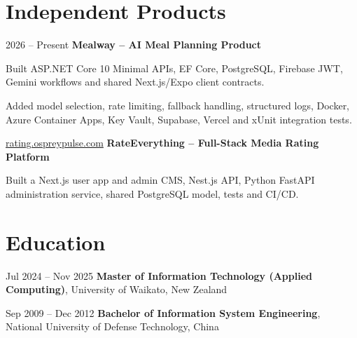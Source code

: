 \documentclass[10pt, letterpaper]{article}
\begin{document}
    \section{Independent Products}
        \begin{twocolentry}{2026 -- Present}
            \textbf{Mealway -- AI Meal Planning Product}
        \end{twocolentry}
        \begin{onecolentry}
            \begin{highlights}
                \item Built ASP.NET Core 10 Minimal APIs, EF Core, PostgreSQL, Firebase JWT, Gemini workflows and shared Next.js/Expo client contracts.
                \item Added model selection, rate limiting, fallback handling, structured logs, Docker, Azure Container Apps, Key Vault, Supabase, Vercel and xUnit integration tests.
            \end{highlights}
        \end{onecolentry}

        \vspace{0.15 cm}
        \begin{twocolentry}{\href{https://rating.ospreypulse.com}{rating.ospreypulse.com}}
            \textbf{RateEverything -- Full-Stack Media Rating Platform}
        \end{twocolentry}
        \begin{onecolentry}
            \begin{highlights}
                \item Built a Next.js user app and admin CMS, Nest.js API, Python FastAPI administration service, shared PostgreSQL model, tests and CI/CD.
            \end{highlights}
        \end{onecolentry}

    \section{Education}
        \begin{twocolentry}{Jul 2024 -- Nov 2025}
            \textbf{Master of Information Technology (Applied Computing)}, University of Waikato, New Zealand
        \end{twocolentry}
        \vspace{0.10 cm}
        \begin{twocolentry}{Sep 2009 -- Dec 2012}
            \textbf{Bachelor of Information System Engineering}, National University of Defense Technology, China
        \end{twocolentry}
\end{document}
